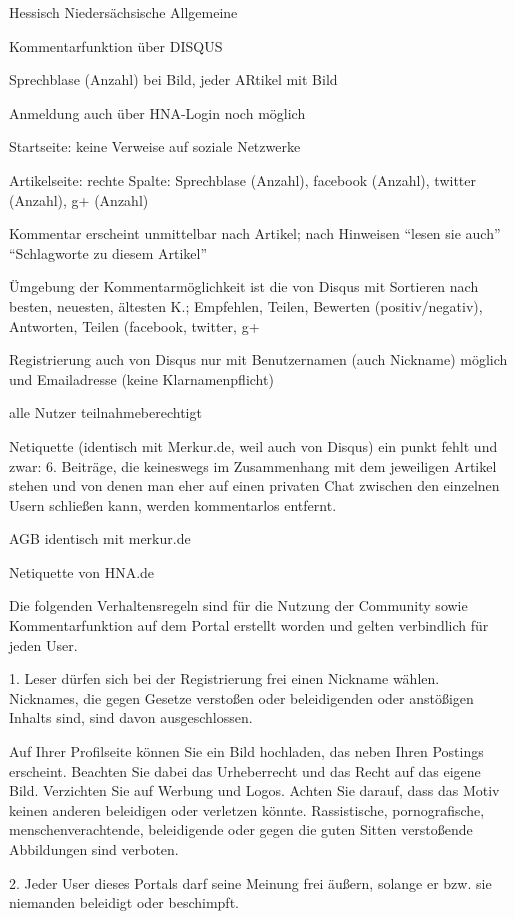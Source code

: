 Hessisch Niedersächsische Allgemeine

Kommentarfunktion über DISQUS

Sprechblase (Anzahl) bei Bild, jeder ARtikel mit Bild 

Anmeldung auch über HNA-Login noch möglich

Startseite: keine Verweise auf soziale Netzwerke

Artikelseite: rechte Spalte: Sprechblase (Anzahl), facebook (Anzahl), twitter (Anzahl), g+ (Anzahl)

Kommentar erscheint unmittelbar nach Artikel; nach Hinweisen ``lesen sie auch''  ``Schlagworte zu diesem Artikel''

Ümgebung der Kommentarmöglichkeit ist die von Disqus mit Sortieren nach besten, neuesten, ältesten K.; Empfehlen, Teilen, Bewerten (positiv/negativ), Antworten, Teilen (facebook, twitter, g+

Registrierung auch von Disqus nur mit Benutzernamen (auch Nickname) möglich und Emailadresse (keine Klarnamenpflicht)

alle Nutzer teilnahmeberechtigt

Netiquette (identisch mit Merkur.de, weil auch von Disqus) ein punkt fehlt und zwar: 
6. Beiträge, die keineswegs im Zusammenhang mit dem jeweiligen Artikel stehen und von denen man eher auf einen privaten Chat zwischen den einzelnen Usern schließen kann, werden kommentarlos entfernt.

AGB identisch mit merkur.de



Netiquette von HNA.de

Die folgenden Verhaltensregeln sind für die Nutzung der Community sowie Kommentarfunktion auf dem Portal erstellt worden und gelten verbindlich für jeden User.

1. Leser dürfen sich bei der Registrierung frei einen Nickname wählen. Nicknames, die gegen Gesetze verstoßen oder beleidigenden oder anstößigen Inhalts sind, sind davon ausgeschlossen.

Auf Ihrer Profilseite können Sie ein Bild hochladen, das neben Ihren Postings erscheint. Beachten Sie dabei das Urheberrecht und das Recht auf das eigene Bild. Verzichten Sie auf Werbung und Logos. Achten Sie darauf, dass das Motiv keinen anderen beleidigen oder verletzen könnte. Rassistische, pornografische, menschenverachtende, beleidigende oder gegen die guten Sitten verstoßende Abbildungen sind verboten.

2. Jeder User dieses Portals darf seine Meinung frei äußern, solange er bzw. sie niemanden beleidigt oder beschimpft.

